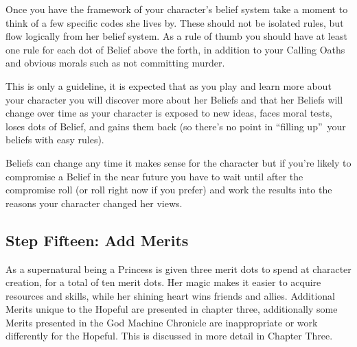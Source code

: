 \noindent Once you have the framework of your character's belief system take a moment to think of a few specific codes she lives by. These should not be isolated rules, but flow logically from her belief system. As a rule of thumb you should have at least one rule for each dot of Belief above the forth, in addition to your Calling Oaths and obvious morals such as not committing murder. 

This is only a guideline, it is expected that as you play and learn more about your character you will discover more about her Beliefs and that her Beliefs will change over time as your character is exposed to new ideas, faces moral tests, loses dots of Belief, and gains them back (so there's no point in \textquotedblleft filling up\textquotedblright\, your beliefs with easy rules). 

Beliefs can change any time it makes sense for the character but if you're likely to compromise a Belief in the near future you have to wait until after the compromise roll (or roll right now if you prefer) and work the results into the reasons your character changed her views.

\subsection*{Step Fifteen: Add Merits} 

As a supernatural being a Princess is given three merit dots to spend at character creation, for a total of ten merit dots. Her magic makes it easier to acquire resources and skills, while her shining heart wins friends and allies. Additional Merits unique to the Hopeful are presented in chapter three, additionally some Merits presented in the God Machine Chronicle are inappropriate or work differently for the Hopeful. This is discussed in more detail in Chapter Three. 



